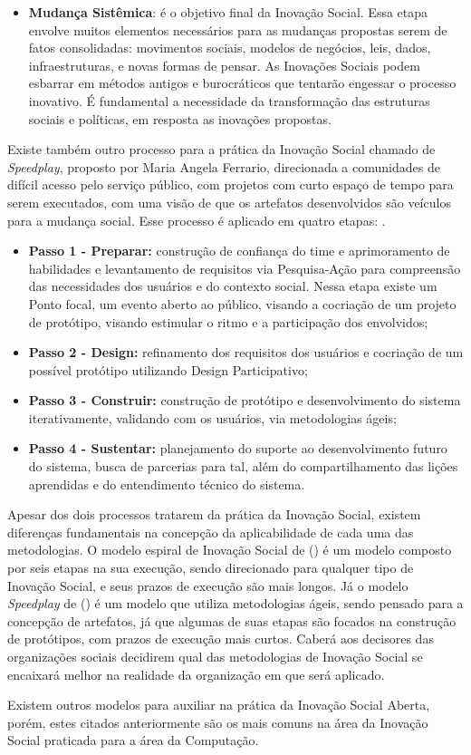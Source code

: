 \begin{itemize}
    \item \textbf{Mudança Sistêmica}: é o objetivo final da Inovação Social. Essa etapa envolve muitos elementos necessários para as mudanças propostas serem de fatos consolidadas: movimentos sociais, modelos de negócios, leis, dados, infraestruturas, e novas formas de pensar. As Inovações Sociais podem esbarrar em métodos antigos e burocráticos que tentarão engessar o processo inovativo. É fundamental a necessidade da transformação das estruturas sociais e políticas, em resposta as inovações propostas.
\end{itemize}

Existe também outro processo para a prática da Inovação Social chamado de \textit{Speedplay}, proposto por Maria Angela Ferrario, direcionada a comunidades de difícil acesso pelo serviço público, com projetos com curto espaço de tempo para serem executados, com uma visão de que os artefatos desenvolvidos são veículos para a mudança social. Esse processo é aplicado em quatro etapas: \cite{ferrario2014}. 



\begin{itemize}
    \item \textbf{Passo 1 - Preparar:} construção de confiança do time e aprimoramento de habilidades e levantamento de requisitos via Pesquisa-Ação para compreensão das necessidades dos usuários e do contexto social. Nessa etapa existe um Ponto focal, um evento aberto ao público, visando a cocriação de um projeto de protótipo, visando estimular o ritmo e a participação dos envolvidos;
    \item \textbf{Passo 2 - Design:} refinamento dos requisitos dos usuários e cocriação de um possível protótipo utilizando Design Participativo;
    \item \textbf{Passo 3 - Construir:} construção de protótipo e desenvolvimento do sistema iterativamente, validando com os usuários, via metodologias ágeis;
    \item \textbf{Passo 4 - Sustentar:} planejamento do suporte ao desenvolvimento futuro do sistema, busca de parcerias para tal, além do compartilhamento das lições aprendidas e do entendimento técnico do sistema.
\end{itemize}

Apesar dos dois processos tratarem da prática da Inovação Social, existem diferenças fundamentais na concepção da aplicabilidade de cada uma das metodologias. O modelo espiral de Inovação Social de \citeauthor{murray2010} (\citeyear{murray2010}) é um modelo composto por seis etapas na sua execução, sendo direcionado para qualquer tipo de Inovação Social, e seus prazos de execução são mais longos. Já o modelo \textit{Speedplay} de \citeauthor{ferrario2014} (\citeyear{ferrario2014}) é um modelo que utiliza metodologias ágeis, sendo pensado para a concepção de artefatos, já que algumas de suas etapas são focados na construção de protótipos, com prazos de execução mais curtos. Caberá aos decisores das organizações sociais decidirem qual das metodologias de Inovação Social se encaixará melhor na realidade da organização em que será aplicado.

Existem outros modelos para auxiliar na prática da Inovação Social Aberta, porém, estes citados anteriormente são os mais comuns na área da Inovação Social praticada para a área da Computação.

